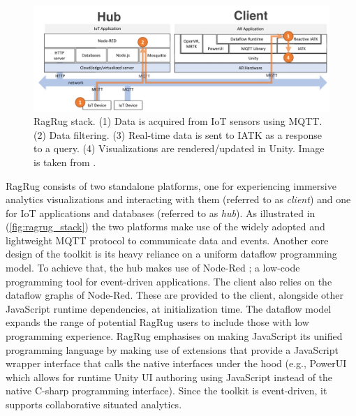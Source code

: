 \documentclass{vgtc}                          %
\begin{document}
\begin{figure}[tb]
	\centering
	\includegraphics[width=\columnwidth]{ragrug_stack}
	\caption[Caption for RagRug]{RagRug stack. (1) Data is acquired from IoT
		sensors using MQTT. (2) Data filtering. (3) Real-time data is sent to
		IATK as a response to a query. (4) Visualizations are
        rendered/updated in Unity. Image is taken from \cite{ragrug_toolkit}.}
	\label{fig:ragrug_stack}
\end{figure}

\medskip

\noindent RagRug consists of two standalone platforms, one for experiencing immersive analytics
visualizations and interacting with them (referred to as \textit{client}) and one for IoT applications and
databases (referred to as \textit{hub}). As illustrated in (\autoref{fig:ragrug_stack}) the two
platforms make use of the widely adopted and lightweight MQTT \cite{mqtt} protocol to
communicate data and events. Another core design of the toolkit is its heavy reliance on a uniform
dataflow programming model. To achieve that, the hub makes use of Node-Red \cite{nodered};
a low-code programming tool for event-driven applications. The client also relies on the dataflow graphs of
Node-Red. These are provided to the client, alongside other JavaScript runtime dependencies, at
initialization time. The dataflow model expands the range of potential RagRug users to include those with
low programming experience. RagRug emphasises on making JavaScript its unified programming language by making
use of extensions that provide a JavaScript wrapper interface that calls the native interfaces under the hood
(e.g., PowerUI \cite{powerui} which allows for runtime Unity UI authoring using
JavaScript instead of the native C-sharp programming interface). Since the toolkit is event-driven, it
supports collaborative situated analytics.


\medskip
\end{document}
